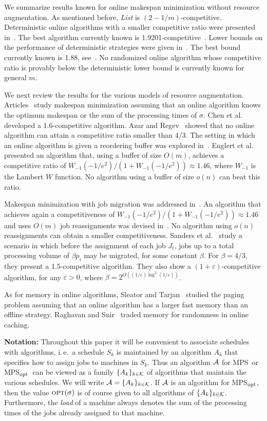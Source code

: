 \documentclass{llncs}
\newcommand{\OPT}{\text{{\sc opt}}}
\newcommand{\opt}{\OPT}
\newcommand{\MPS}{{\rm MPS}}
\newcommand{\MPSO}{{\rm MPS$_{\rm opt}$}}
\newcommand{\eps}{\varepsilon}
\begin{document}
We summarize results known for online makespan minimization without resource augmentation. As mentioned before, 
{\em List\/} is $(2-1/m)$-competitive. Deterministic online algorithms with a smaller competitive ratio were
presented in~\cite{A,BFKV,FW,GW,KPT}. The best algorithm currently known is 1.9201-competitive~\cite{FW}.
Lower bounds on the performance of deterministic strategies were given in~\cite{A,BKR,FKT,GRTW,R,RC}.
The best bound currently known is 1.88, see~\cite{R}. No randomized online algorithm whose competitive 
ratio is provably below the deterministic lower bound is currently known for general $m$. 

We next review the results for the various models of resource augmentation.
Articles~\cite{ANST,AST,AST2,AR,CKK,KKST} study makespan minimization assuming that an online algorithm knows
the optimum makespan or the sum of the processing times of $\sigma$. Chen et al.~\cite{CKK} developed a
1.6-competitive algorithm. Azar and Regev~\cite{AR} showed that no online algorithm can attain a competitive
ratio smaller than 4/3. The setting in which an online algorithm is given a reordering buffer
was explored in~\cite{EOW,KKST}. Englert et al.~\cite{EOW} presented an algorithm that, using a buffer
of size $O(m)$, achieves a competitive ratio of $W_{-1}(-1/e^2)/(1+ W_{-1}(-1/e^2))\approx 1.46$,
where $W_{-1}$ is the Lambert $W$ function. No algorithm using a buffer of size $o(n)$ can beat 
this ratio. 

Makespan minimization with job migration was addressed in~\cite{AH,SSS}. An algorithm that
achieves again a competitiveness of $W_{-1}(-1/e^2)/(1+ W_{-1}(-1/e^2))\approx 1.46$ and uses $O(m)$ job
reassignments was devised in~\cite{AH}. No algorithm using $o(n)$ reassignments can obtain
a smaller competitiveness. Sanders et al.~\cite{SSS} study a  scenario in which before the assignment 
of each job $J_t$, jobs up to a total processing volume of $\beta p_i$ may be migrated, for some constant
$\beta$. For $\beta=4/3$, they present a 1.5-competitive algorithm. They also show a $(1+\eps)$-competitive
algorithm, for any $\eps >0$, where $\beta = 2^{O((1/\eps)\log^2(1/\eps))}$. 

As for memory in online algorithms, Sleator and Tarjan~\cite{ST} studied the paging problem assuming that an
online algorithm has a larger fast memory than an offline strategy. Raghavan and Snir~\cite{RS} traded memory for randomness 
in online caching. 

{\bf Notation:} Throughout this paper it will be convenient to associate schedules with algorithms, i.\,e.\ a 
schedule $S_k$ is maintained by an algorithm $A_k$ that specifies how to assign jobs to machines in $S_k$. Thus an
algorithm ${\cal A}$ for \MPS\ or \MPSO\ can be viewed as a family $\{A_k\}_{k\in {\cal K}}$ of algorithms 
that maintain the various schedules. We will write ${\cal A} = \{A_k\}_{k\in {\cal K}}$. If ${\cal A}$ is an 
algorithm for \MPSO, then the value $\opt(\sigma)$ is of course given to all algorithms of $\{A_k\}_{k\in {\cal K}}$. 
Furthermore, the {\em load\/} of a machine always denotes the sum of the processing
times of the jobs already assigned to that machine.
\end{document}
